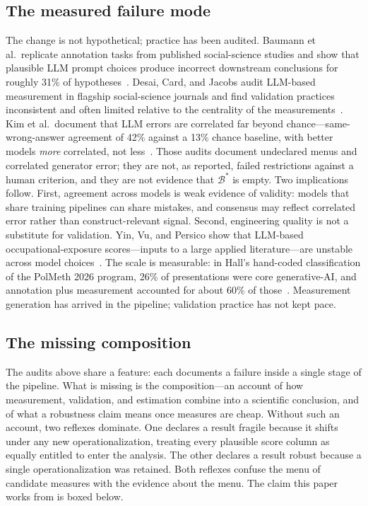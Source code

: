 \documentclass[10pt,letterpaper]{article}
\newcommand{\Bset}{\mathcal{B}}
\begin{document}
\subsection{The measured failure mode}
The change is not hypothetical; practice has been audited.
Baumann et al.~replicate annotation tasks from published social-science studies and show that plausible LLM prompt choices produce incorrect downstream conclusions for roughly 31\% of hypotheses~\cite{bauman2026}.
Desai, Card, and Jacobs audit LLM-based measurement in flagship social-science journals and find validation practices inconsistent and often limited relative to the centrality of the measurements~\cite{desai2026}.
Kim et al.~document that LLM errors are correlated far beyond chance---same-wrong-answer agreement of 42\% against a 13\% chance baseline, with better models \emph{more} correlated, not less~\cite{kim2025}.
Those audits document undeclared menus and correlated generator error; they are not, as reported, failed restrictions against a human criterion, and they are not evidence that $\Bset^*$ is empty.
Two implications follow.
First, agreement across models is weak evidence of validity: models that share training pipelines can share mistakes, and consensus may reflect correlated error rather than construct-relevant signal.
Second, engineering quality is not a substitute for validation.
Yin, Vu, and Persico show that LLM-based occupational-exposure scores---inputs to a large applied literature---are unstable across model choices~\cite{yinvu2026}.
The scale is measurable: in Hall's hand-coded classification of the PolMeth 2026 program, 26\% of presentations were core generative-AI, and annotation plus measurement accounted for about 60\% of those~\cite{hall2026}.
Measurement generation has arrived in the pipeline; validation practice has not kept pace.

\subsection{The missing composition}
The audits above share a feature: each documents a failure inside a single stage of the pipeline.
What is missing is the composition---an account of how measurement, validation, and estimation combine into a scientific conclusion, and of what a robustness claim means once measures are cheap.
Without such an account, two reflexes dominate.
One declares a result fragile because it shifts under any new operationalization, treating every plausible score column as equally entitled to enter the analysis.
The other declares a result robust because a single operationalization was retained.
Both reflexes confuse the menu of candidate measures with the evidence about the menu.
The claim this paper works from is boxed below.
\end{document}
